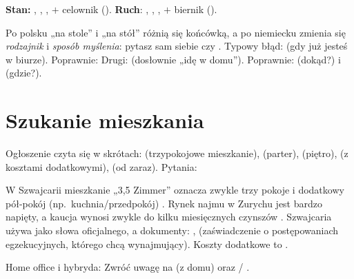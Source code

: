 \begin{zasada}
\textbf{Stan:} , , ,  $+$ celownik (). \textbf{Ruch}: , ,
,  $+$ biernik (). 
\end{zasada}

\begin{falle}
Po polsku „na stole” i „na stół” różnią się końcówką, a po niemiecku zmienia się \emph{rodzajnik} i
\emph{sposób myślenia}: pytasz sam siebie  czy . Typowy błąd:  (gdy już jesteś
w biurze). Poprawnie:  Drugi:  (dosłownie „idę w domu”). Poprawnie:
 (dokąd?) i  (gdzie?).
\end{falle}

\section{Szukanie mieszkania}
Ogłoszenie czyta się w skrótach:  (trzypokojowe mieszkanie),  (parter),  (piętro), 
(z kosztami dodatkowymi),  (od zaraz). Pytania:  
 

\begin{szwajcaria}
W Szwajcarii mieszkanie „3,5 Zimmer” oznacza zwykle trzy pokoje i dodatkowy pół-pokój (np.\ kuchnia/przedpokój)
. Rynek najmu w Zurychu jest bardzo napięty, a kaucja wynosi
zwykle do kilku miesięcznych czynszów .
Szwajcaria używa  jako słowa oficjalnego, a dokumenty: , 
(zaświadczenie o postępowaniach egzekucyjnych, którego chcą wynajmujący). Koszty dodatkowe to .
\end{szwajcaria}

\begin{praca}
Home office i hybryda:   
 Zwróć uwagę na  (z domu) oraz  / .
\end{praca}

